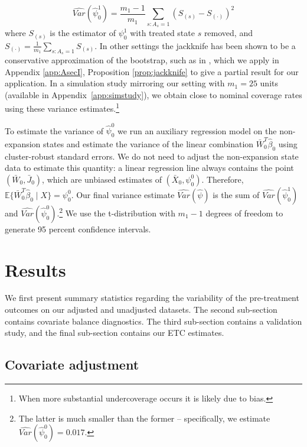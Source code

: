 \documentclass[aoas]{imsart}
\theoremstyle{plain}
\theoremstyle{remark}
\begin{document}
\begin{equation}\label{eqn:jackknife}
 \hat{Var}(\hat{\psi}_0^1) = \frac{m_1 - 1}{m_1} \sum_{s:A_s = 1} \left( S_{(s)} - S_{(\cdot)} \right)^2
\end{equation}
%
where $S_{(s)}$ is the estimator of $\psi_0^1$ with treated state $s$ removed, and $S_{(\cdot)} = \frac{1}{m_1} \sum_{s:A_s=1} S_{(s)}$. In other settings the jackknife has been shown to be a conservative approximation of the bootstrap, such as in \cite{efron1981jackknife}, which we apply in Appendix \ref{app:AsecI}, Proposition \ref{prop:jackknife} to give a partial result for our application. In a simulation study mirroring our setting with $m_1 = 25$ units (available in Appendix~\ref{app:simstudy}), we obtain close to nominal coverage rates using these variance estimates.\footnote{When more substantial undercoverage occurs it is likely due to bias.}

To estimate the variance of $\hat{\psi}_0^0$ we run an auxiliary regression model on the non-expansion states and estimate the variance of the linear combination $\bar{W}_0^T\hat{\beta}_0$ using cluster-robust standard errors. We do not need to adjust the non-expansion state data to estimate this quantity: a linear regression line always contains the point $(\bar{W}_0, \bar{J}_0)$, which are unbiased estimates of $(\bar{X}_0, \psi_0^0)$. Therefore, $\mathbb{E}\{\bar{W}_0^T\hat{\beta}_0 \mid X\} = \psi_0^0$. Our final variance estimate $\hat{Var}(\hat{\psi})$ is the sum of $\hat{Var}(\hat{\psi}_0^1)$ and $\hat{Var}(\hat{\psi}_0^0)$.\footnote{The latter is much smaller than the former -- specifically, we estimate $\hat{Var}(\hat{\psi}_0^0) = 0.017$.} We use the t-distribution with $m_1 - 1$ degrees of freedom to generate 95 percent confidence intervals.

\section{Results}\label{sec:results}

We first present summary statistics regarding the variability of the pre-treatment outcomes on our adjusted and unadjusted datasets. The second sub-section contains covariate balance diagnostics. The third sub-section contains a validation study, and the final sub-section contains our ETC estimates.

\subsection{Covariate adjustment}
\end{document}
